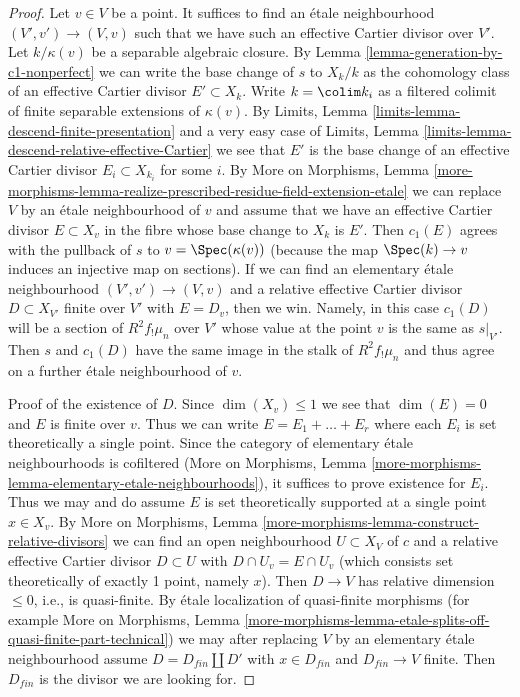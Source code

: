 \begin{proof}
Let $v \in V$ be a point. It suffices to find an \'etale neighbourhood
$(V', v') \to (V, v)$ such that we have such an effective Cartier divisor
over $V'$. Let $k/\kappa(v)$ be a separable algebraic closure. By
Lemma \ref{lemma-generation-by-c1-nonperfect}
we can write the base change of $s$ to $X_k/k$ as the
cohomology class of an effective Cartier divisor $E' \subset X_k$.
Write $k = \colim k_i$ as a filtered colimit of finite separable
extensions of $\kappa(v)$. By
Limits, Lemma \ref{limits-lemma-descend-finite-presentation}
and a very easy case of
Limits, Lemma \ref{limits-lemma-descend-relative-effective-Cartier}
we see that $E'$ is the base change of an effective Cartier
divisor $E_i \subset X_{k_i}$ for some $i$. By
More on Morphisms, Lemma
\ref{more-morphisms-lemma-realize-prescribed-residue-field-extension-etale}
we can replace $V$ by an \'etale neighbourhood of $v$
and assume that we have an effective Cartier divisor $E \subset X_v$
in the fibre whose base change to $X_k$ is $E'$.
Then $c_1(E)$ agrees with the pullback of $s$ to $v = \Spec(\kappa(v))$
(because the map $\Spec(k) \to v$ induces an injective map on sections).
If we can find an elementary \'etale neighbourhood $(V', v') \to (V, v)$
and a relative effective Cartier divisor $D \subset X_{V'}$ finite
over $V'$ with $E = D_v$, then we win. Namely, in this case
$c_1(D)$ will be a section of $R^2f_!\mu_n$ over $V'$ whose value
at the point $v$ is the same as $s|_{V'}$. Then
$s$ and $c_1(D)$ have the same image in the stalk of $R^2f_!\mu_n$ and
thus agree on a further \'etale neighbourhood of $v$.

\medskip\noindent
Proof of the existence of $D$.
Since $\dim(X_v) \leq 1$ we see that $\dim(E) = 0$ and $E$ is finite
over $v$. Thus we can write $E = E_1 + \ldots + E_r$ where
each $E_i$ is set theoretically a single point. Since the category
of elementary \'etale neighbourhoods is cofiltered
(More on Morphisms, Lemma
\ref{more-morphisms-lemma-elementary-etale-neighbourhoods}), it suffices
to prove existence for $E_i$. Thus we may and do
assume $E$ is set theoretically
supported at a single point $x \in X_v$. By
More on Morphisms, Lemma \ref{more-morphisms-lemma-construct-relative-divisors}
we can find an open neighbourhood
$U \subset X_V$ of $c$ and a relative effective Cartier divisor
$D \subset U$ with $D \cap U_v = E \cap U_v$ (which consists set
theoretically of exactly 1 point, namely $x$). Then $D \to V$
has relative dimension $\leq 0$, i.e., is quasi-finite.
By \'etale localization of quasi-finite morphisms
(for example More on Morphisms, Lemma
\ref{more-morphisms-lemma-etale-splits-off-quasi-finite-part-technical})
we may after replacing $V$ by an elementary \'etale neighbourhood
assume $D = D_{fin} \amalg D'$ with $x \in D_{fin}$ and
$D_{fin} \to V$ finite. Then $D_{fin}$ is the divisor we
are looking for.
\end{proof}


